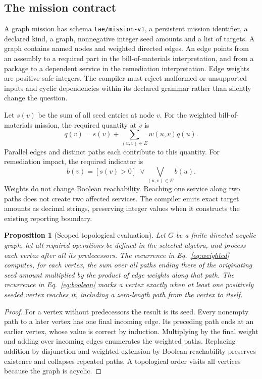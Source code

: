 \documentclass[11pt]{article}
\newtheorem{proposition}{Proposition}
\begin{document}
\subsection{The mission contract}

A graph mission has schema \texttt{tae/mission-v1}, a persistent mission identifier, a declared kind, a graph, nonnegative integer seed amounts and a list of targets. A graph contains named nodes and weighted directed edges. An edge points from an assembly to a required part in the bill-of-materials interpretation, and from a package to a dependent service in the remediation interpretation. Edge weights are positive safe integers. The compiler must reject malformed or unsupported inputs and cyclic dependencies within its declared grammar rather than silently change the question.

Let $s(v)$ be the sum of all seed entries at node $v$. For the weighted bill-of-materials mission, the required quantity at $v$ is
\begin{equation}
q(v)=s(v)+\sum_{(u,v)\in E}w(u,v)q(u).
\label{eq:weighted}
\end{equation}
Parallel edges and distinct paths each contribute to this quantity. For remediation impact, the required indicator is
\begin{equation}
b(v)=[s(v)>0]\;\lor\!\bigvee_{(u,v)\in E} b(u).
\label{eq:boolean}
\end{equation}
Weights do not change Boolean reachability. Reaching one service along two paths does not create two affected services. The compiler emits exact target amounts as decimal strings, preserving integer values when it constructs the existing reporting boundary.

\begin{proposition}[Scoped topological evaluation]
Let $G$ be a finite directed acyclic graph, let all required operations be defined in the selected algebra, and process each vertex after all its predecessors. The recurrence in Eq.~\eqref{eq:weighted} computes, for each vertex, the sum over all paths ending there of the originating seed amount multiplied by the product of edge weights along that path. The recurrence in Eq.~\eqref{eq:boolean} marks a vertex exactly when at least one positively seeded vertex reaches it, including a zero-length path from the vertex to itself.
\end{proposition}

\begin{proof}
For a vertex without predecessors the result is its seed. Every nonempty path to a later vertex has one final incoming edge. Its preceding path ends at an earlier vertex, whose value is correct by induction. Multiplying by the final weight and adding over incoming edges enumerates the weighted paths. Replacing addition by disjunction and weighted extension by Boolean reachability preserves existence and collapses repeated paths. A topological order visits all vertices because the graph is acyclic.
\end{proof}
\end{document}
